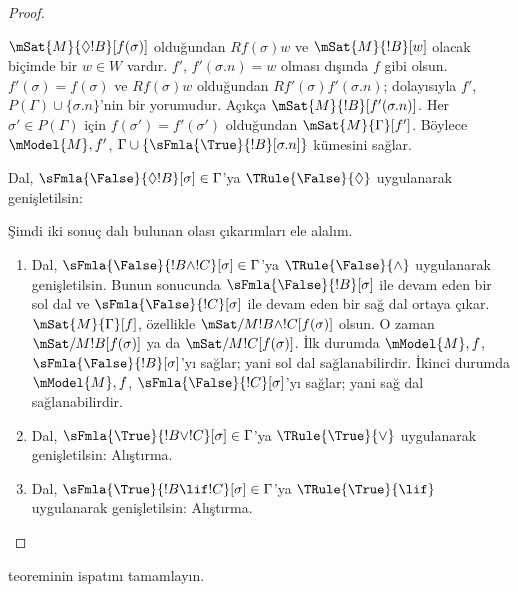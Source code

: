 \begin{proof}
\begin{enumerate}
{{  $\mSat{M}{\Diamond !B}[f(\sigma)]$ olduğundan $Rf(\sigma)w$ ve
  $\mSat{M}{!B}[w]$ olacak biçimde bir $w \in W$ vardır. $f'$,
  $f'(\sigma.n)=w$ olması dışında $f$ gibi olsun. $f'(\sigma)=f(\sigma)$ ve
  $Rf(\sigma)w$ olduğundan $Rf'(\sigma)f'(\sigma.n)$; dolayısıyla $f'$,
  $P(\Gamma) \cup \{\sigma.n\}$'nin bir yorumudur. Açıkça
  $\mSat{M}{!B}[f'(\sigma.n)]$. Her $\sigma' \in P(\Gamma)$ için
  $f(\sigma')=f'(\sigma')$ olduğundan $\mSat{M}{\Gamma}[f']$. Böylece
  $\mModel{M},f'$, $\Gamma \cup
  \{\sFmla{\True}{!B}[\sigma.n]\}$ kümesini sağlar.}
\item Dal, $\sFmla{\False}{\Diamond !B}[\sigma] \in \Gamma$'ya
  $\TRule{\False}{\Diamond}$ uygulanarak genişletilsin:
  }{}
\end{enumerate}
Şimdi iki sonuç dalı bulunan olası çıkarımları ele alalım.
\begin{enumerate}
\item Dal, $\sFmla{\False}{!B \land !C}[\sigma] \in \Gamma$'ya
  $\TRule{\False}{\land}$ uygulanarak genişletilsin. Bunun sonucunda
  $\sFmla{\False}{!B}[\sigma]$ ile devam eden bir sol dal ve
  $\sFmla{\False}{!C}[\sigma]$ ile devam eden bir sağ dal ortaya çıkar.
  $\mSat{M}{\Gamma}[f]$, özellikle
  $\mSat/{M}{!B \land !C}[f(\sigma)]$ olsun. O zaman
  $\mSat/{M}{!B}[f(\sigma)]$ ya da $\mSat/{M}{!C}[f(\sigma)]$. İlk durumda
  $\mModel{M},f$, $\sFmla{\False}{!B}[\sigma]$'yı sağlar; yani sol dal
  sağlanabilirdir. İkinci durumda $\mModel{M},f$,
  $\sFmla{\False}{!C}[\sigma]$'yı sağlar; yani sağ dal sağlanabilirdir.
\item Dal, $\sFmla{\True}{!B \lor !C}[\sigma] \in \Gamma$'ya
    $\TRule{\True}{\lor}$ uygulanarak genişletilsin: Alıştırma.
\item Dal, $\sFmla{\True}{!B \lif !C}[\sigma] \in \Gamma$'ya
    $\TRule{\True}{\lif}$ uygulanarak genişletilsin: Alıştırma.
\end{enumerate}
\end{proof}

\begin{prob}
 teoreminin ispatını tamamlayın.
\end{prob}

